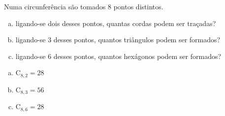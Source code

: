 \begin{ex}
 Numa circunferência são tomados 8 pontos distintos.
    \begin{enumerate}[(a)]
    \item ligando-se dois desses pontos, quantas cordas podem ser traçadas?
    \item ligando-se 3 desses pontos, quantos triângulos podem ser formados?
    \item ligando-se 6 desses pontos, quantos hexágonos podem ser formados?
    \end{enumerate}
      \begin{sol}
       \phantom{A} 
         \begin{enumerate} [(a)]
             \item $\mathrm{C}_{8,2}=28$
             \item $\mathrm{C}_{8,3}=56$
             \item $\mathrm{C}_{8,6}=28$
         \end{enumerate}
      \end{sol}
\end{ex}